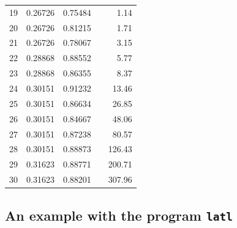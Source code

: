 \begin {table}[hbt]
\begin {tabular}{|rlllr|}
   19  &      0.26726 &     0.75484 &             &      1.14 \\
   20  &      0.26726 &     0.81215 &             &      1.71 \\
   21  &      0.26726 &     0.78067 &             &      3.15 \\
   22  &      0.28868 &     0.88552 &             &      5.77 \\
   23  &      0.28868 &     0.86355 &             &      8.37 \\
   24  &      0.30151 &     0.91232 &             &     13.46 \\
   25  &      0.30151 &     0.86634 &             &     26.85 \\
   26  &      0.30151 &     0.84667 &             &     48.06 \\
   27  &      0.30151 &     0.87238 &             &     80.57 \\
   28  &      0.30151 &     0.88873 &             &    126.43 \\
   29  &      0.31623 &     0.88771 &             &    200.71 \\
   30  &      0.31623 &     0.88201 &             &    307.96 \\
\hline
\end {tabular}
\end {table}

\subsection {An example with the program {\tt latl}}

